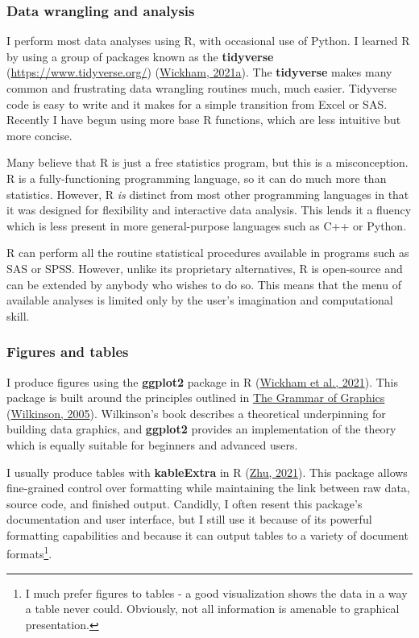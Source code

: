\documentclass[
  letterpaper,
  openany]{book}
\begin{document}
\hypertarget{data-wrangling-and-analysis}{%
\subsubsection{Data wrangling and analysis}\label{data-wrangling-and-analysis}}

I perform most data analyses using R, with occasional use of Python.
I learned R by using a group of packages known as the \textbf{tidyverse} (\url{https://www.tidyverse.org/}) (\protect\hyperlink{ref-R-tidyverse}{Wickham, 2021a}).
The \textbf{tidyverse} makes many common and frustrating data wrangling routines much, much easier.
Tidyverse code is easy to write and it makes for a simple transition from Excel or SAS.
Recently I have begun using more base R functions, which are less intuitive but more concise.

Many believe that R is just a free statistics program, but this is a misconception.
R is a fully-functioning programming language, so it can do much more than statistics.
However, R \emph{is} distinct from most other programming languages in that it was designed for flexibility and interactive data analysis.
This lends it a fluency which is less present in more general-purpose languages such as C++ or Python.

R can perform all the routine statistical procedures available in programs such as SAS or SPSS.
However, unlike its proprietary alternatives, R is open-source and can be extended by anybody who wishes to do so.
This means that the menu of available analyses is limited only by the user's imagination and computational skill.

\hypertarget{figures-and-tables}{%
\subsubsection{Figures and tables}\label{figures-and-tables}}

I produce figures using the \textbf{ggplot2} package in R (\protect\hyperlink{ref-R-ggplot2}{Wickham et al., 2021}).
This package is built around the principles outlined in \underline{The Grammar of Graphics} (\protect\hyperlink{ref-Wilkinson2005}{Wilkinson, 2005}).
Wilkinson's book describes a theoretical underpinning for building data graphics, and \textbf{ggplot2} provides an implementation of the theory which is equally suitable for beginners and advanced users.

I usually produce tables with \textbf{kableExtra} in R (\protect\hyperlink{ref-R-kableExtra}{Zhu, 2021}).
This package allows fine-grained control over formatting while maintaining the link between raw data, source code, and finished output.
Candidly, I often resent this package's documentation and user interface, but I still use it because of its powerful formatting capabilities and because it can output tables to a variety of document formats\footnote{I much prefer figures to tables - a good visualization shows the data in a way a table never could.
  Obviously, not all information is amenable to graphical presentation.}.
\end{document}
